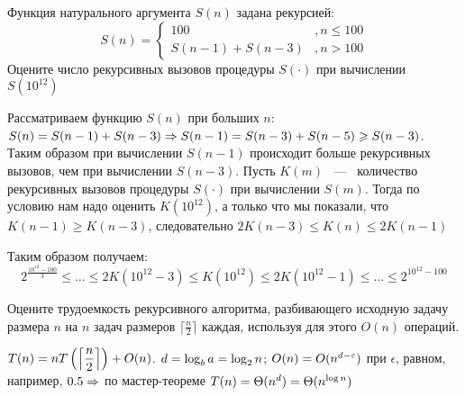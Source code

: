 \documentclass[a4paper,12pt]{article}
\begin{document}
\begin{tasknum}{7}
	
	 Функция натурального аргумента $S(n)$ задана рекурсией:
	$$
	S(n)=\left\{\begin{array}{cc}
	100&, n\leq 100\\
	S(n-1)+S(n-3)&, n>100
	\end{array}
	\right.
	$$      
	Оцените число рекурсивных вызовов процедуры $S(\cdot)$ при вычислении $S(10^{12})$
	
\end{tasknum}

\begin{solution}
	
	Рассматриваем функцию $S(n)$ при больших $n$: $S(n) \hm{=} S(n-1)+S(n-3) \Ra S(n-1) \hm{=} S(n-3) + S(n-5) \ge S(n-3)$. Таким образом при вычислении $S(n-1)$ происходит больше рекурсивных вызовов, чем при вычислении $S(n-3)$. Пусть $K(m)$ ~---~ количество рекурсивных вызовов процедуры $S(\cdot)$ при вычислении $S(m)$. Тогда по условию нам надо оценить $K(10^{12})$, а только что мы показали, что $K(n-1) \ge K(n-3)$, следовательно $2K(n-3) \le K(n) \le 2K(n-1)$
	
	Таким образом получаем:
	$$2^{\frac{10^{12} - 100}{3}} \le \ldots \le 2K(10^{12}-3) \le K(10^{12}) \le 2K(10^{12} - 1) \le \ldots \le 2^{10^{12} - 100}$$
	
\end{solution}

\begin{tasknum}{9}
	Оцените трудоемкость рекурсивного алгоритма, разбивающего исходную задачу размера $n$ на $n$ задач размеров $\lceil \frac n 2 \rceil$ каждая, используя для этого $O(n)$ операций. 
\end{tasknum}

\begin{solution}
	
	$T(n) \hm{=} nT\left(\left\lceil \dfrac{n}{2} \right \rceil \right) + O(n)$. $d \hm{=} \log_b a \hm{=} \log_2 n$; $O(n) \hm{=} O(n^{d-\epsilon})$ при $\epsilon$, равном, например, $0.5 \Rightarrow$ по мастер-теореме $T(n) \hm{=} \Theta(n^d) \hm{=} \Theta(n^{\log n})$
	
\end{solution}
\end{document}

